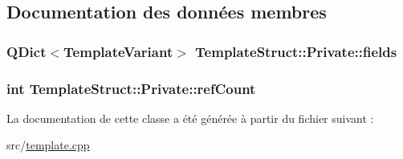 \subsection{Documentation des données membres}
\hypertarget{class_template_struct_1_1_private_a9c785278a02a0ef8e5881511e2c0ce7d}{}
\subsubsection[{fields}]{\setlength{\rightskip}{0pt plus 5cm}Q\+Dict$<${\bf Template\+Variant}$>$ Template\+Struct\+::\+Private\+::fields}\label{class_template_struct_1_1_private_a9c785278a02a0ef8e5881511e2c0ce7d}
\hypertarget{class_template_struct_1_1_private_a764293e13d3e06c4a5e9fef7135ce1bb}{}
\subsubsection[{ref\+Count}]{\setlength{\rightskip}{0pt plus 5cm}int Template\+Struct\+::\+Private\+::ref\+Count}\label{class_template_struct_1_1_private_a764293e13d3e06c4a5e9fef7135ce1bb}


La documentation de cette classe a été générée à partir du fichier suivant \+:\begin{DoxyCompactItemize}
\item 
src/\hyperlink{template_8cpp}{template.\+cpp}\end{DoxyCompactItemize}
